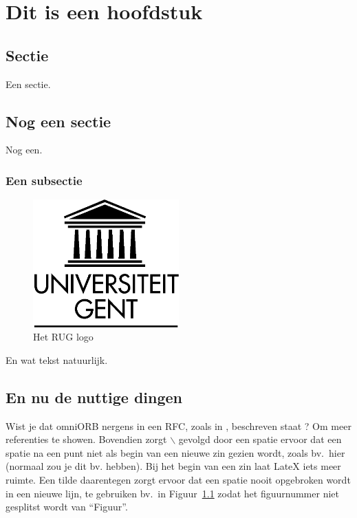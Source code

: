 \chapter{Dit is een hoofdstuk}

\section{Sectie}

Een sectie.

\section{Nog een sectie}
\label{sec:nogeensectie}

Nog een.

\subsection{Een subsectie}

\begin{figure}[htb]
\begin{center}
 \includegraphics[keepaspectratio,width=0.5\textwidth]{fig/ruglogo}
 \caption{Het RUG logo}
 \label{fig:ruglogo}
\end{center}
\end{figure}

En wat tekst natuurlijk.

\section{En nu de nuttige dingen}

Wist je dat omniORB\cite{omniorb} nergens in een RFC, zoals in \cite{2-BIT}, beschreven staat ? Om meer referenties\cite{omniorb, 2-BIT} te showen. Bovendien zorgt $\backslash$ gevolgd door een spatie ervoor dat een spatie na
een punt niet als begin van een nieuwe zin gezien wordt, zoals bv.\ hier (normaal zou je dit bv. hebben). Bij het begin van een zin laat LateX iets meer ruimte. Een tilde daarentegen
zorgt ervoor dat een spatie nooit opgebroken wordt in een nieuwe lijn, te gebruiken bv.\ in Figuur~\ref{fig:ruglogo} zodat het figuurnummer niet
gesplitst wordt van ``Figuur''.

